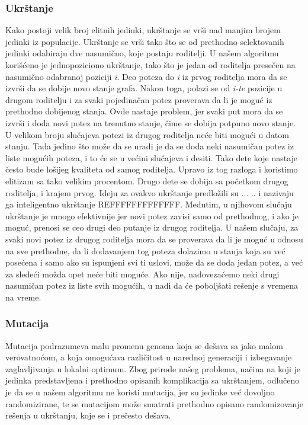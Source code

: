 \documentclass[12pt]{article}
\begin{document}
	
	
	\subsubsection{Ukrštanje}
	\label{subsec:podnaslov2}
	
	Kako postoji velik broj elitnih jedinki, ukrštanje se vrši nad manjim brojem jedinki iz populacije. Ukrštanje se vrši tako što se od prethodno selektovanih jedinki odabiraju dve nasumično, koje postaju roditelji. U našem algoritmu korišćeno je jednopoziciono ukrštanje, tako što je jedan od roditelja presečen na nasumično odabranoj poziciji \textit{i}. Deo poteza do \textit{i} iz prvog roditelja mora da se izvrši da se dobije novo stanje grafa. Nakon toga, polazi se od \textit{i-te} pozicije u drugom roditelju i za svaki pojedinačan potez proverava da li je moguć iz prethodno dobijenog stanja. Ovde nastaje problem, jer svaki put mora da se izvrši i doda novi potez na trenutno stanje, čime se dobija potpuno novo stanje. U velikom broju slučajeva potezi iz drugog roditelja neće biti mogući u datom stanju. Tada jedino što može da se uradi je da se doda neki nasumičan potez iz liste mogućih poteza, i to će se u većini slučajeva i desiti. Tako dete koje nastaje često bude lošijeg kvaliteta od samog roditelja. Upravo iz tog razloga i koristimo elitizam sa tako velikim procentom. Drugo dete se dobija sa početkom drugog roditelja, i krajem prvog. Ideju za ovakvo ukrštanje predložili su ... .. i nazivaju ga inteligentno ukrštanje REFFFFFFFFFFFFF. Međutim, u njihovom slučaju ukrštanje je mnogo efektivnije jer novi potez zavisi samo od prethodnog, i ako je moguć, prenosi se ceo drugi deo putanje iz drugog roditelja. U našem slučaju, za svaki novi potez iz drugog roditelja mora da se proverava da li je moguć u odnosu na sve prethodne, da li dodavanjem tog poteza dolazimo u stanja koja su već posećena i samo ako su ispunjeni svi ti uslovi, može da se doda jedan potez, a već za sledeći možda opet neće biti moguće. Ako nije, nadovezaćemo neki drugi nasumičan potez iz liste svih mogućih, u nadi da će poboljšati rešenje s vremena na vreme. 

	\subsubsection{Mutacija}
	\label{subsec:podnaslov3}
	Mutacija podrazumeva malu promenu genoma koja se dešava sa jako malom verovatnoćom, a koja omogućava različitost u narednoj generaciji i izbegavanje zaglavljivanja u lokalni optimum. Zbog prirode našeg problema, načina na koji je jedinka predstavljena i prethodno opisanih komplikacija sa  ukrštanjem, odlučeno je da se u našem algoritmu ne koristi mutacija, jer su jedinke već dovoljno randomizirane, te se mutacijom može smatrati prethodno opisano randomizovanje rešenja u ukrštanju, koje se i prečesto dešava. 
\end{document}
